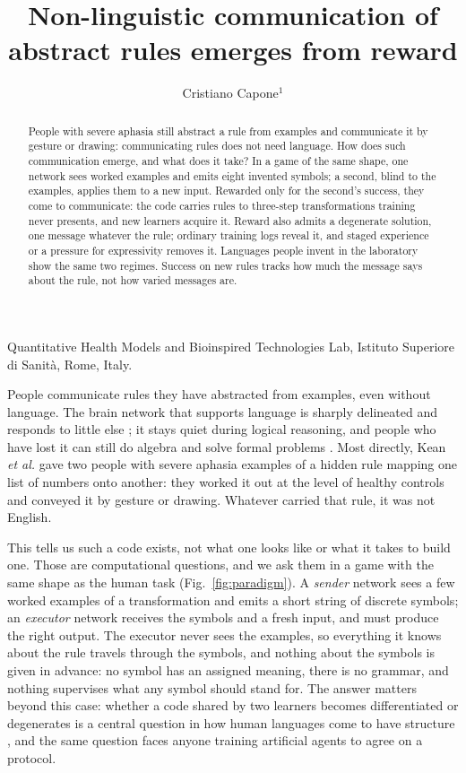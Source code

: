 \documentclass{nature}
\title{Non-linguistic communication of abstract rules emerges from reward}
\author{Cristiano Capone$^{1}$}
\begin{document}
\maketitle
\begin{affiliations}
 \item Quantitative Health Models and Bioinspired Technologies Lab, Istituto Superiore di Sanit\`a, Rome, Italy.
\end{affiliations}

\begin{abstract}
People with severe aphasia still abstract a rule from examples and communicate it by gesture or drawing:
communicating rules does not need language. How does such communication emerge, and what does it take? In a game
of the same shape, one network sees worked examples and emits eight invented symbols; a second, blind to the
examples, applies them to a new input. Rewarded only for the second's success, they come to communicate: the code
carries rules to three-step transformations training never presents, and new learners acquire it. Reward also
admits a degenerate solution, one message whatever the rule; ordinary training logs reveal it, and staged
experience or a pressure for expressivity removes it. Languages people invent in the laboratory show the same two
regimes. Success on new rules tracks how much the message says about the rule, not how varied messages are.
\end{abstract}



People communicate rules they have abstracted from examples, even without language. The brain network that supports language is
sharply delineated and responds to little else \cite{shain2026,fedorenko2024nrn}; it stays quiet during logical
reasoning, and people who have lost it can still do algebra and solve formal problems
\cite{monti2012,varley2005,fedorenko2024}. Most directly, Kean \emph{et al.}\cite{kean2026} gave two people with
severe aphasia examples of a hidden rule mapping one list of numbers onto another: they worked it out at the level
of healthy controls and conveyed it by gesture or drawing. Whatever carried that rule, it was not English.

This tells us such a code exists, not what one looks like or what it takes to build one. Those are computational
questions, and we ask them in a game with the same shape as the human task (Fig.~\ref{fig:paradigm}). A
\emph{sender} network sees a few worked examples of a transformation and emits a short string of discrete
symbols; an \emph{executor} network receives the symbols and a fresh input, and must produce the right output.
The executor never sees the examples, so everything it knows about the rule travels through the symbols, and
nothing about the symbols is given in advance: no symbol has an assigned meaning, there is no grammar, and nothing
supervises what any symbol should stand for. The answer matters beyond this case: whether a code shared by
two learners becomes differentiated or degenerates is a central question in how human languages come to have
structure \cite{kirby2015}, and the same question faces anyone training artificial agents to agree on a protocol.
\end{document}
